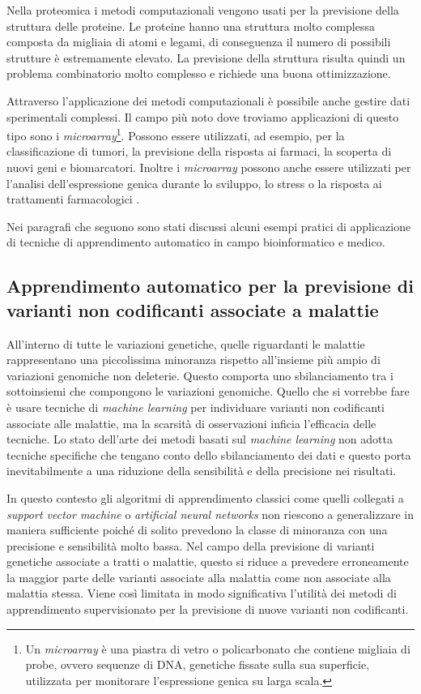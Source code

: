 \documentclass[12pt,italian]{report}
\begin{document}
	Nella proteomica i metodi computazionali vengono usati per la previsione della struttura delle proteine. Le proteine hanno una struttura molto complessa composta da migliaia di atomi e legami, di conseguenza il numero di possibili strutture è estremamente elevato. La previsione della struttura risulta quindi un problema combinatorio molto complesso e richiede una buona ottimizzazione.
	
	Attraverso l'applicazione dei metodi computazionali è possibile anche gestire dati sperimentali complessi. Il campo più noto dove troviamo applicazioni di questo tipo sono i \textit{microarray}\footnote{Un \textit{microarray} è una piastra di vetro o policarbonato che contiene migliaia di probe, ovvero sequenze di DNA, genetiche fissate sulla sua superficie, utilizzata per monitorare l'espressione genica su larga scala.}. Possono essere utilizzati, ad esempio, per la classificazione di tumori, la previsione della risposta ai farmaci, la scoperta di nuovi geni e biomarcatori. Inoltre i \textit{microarray} possono anche essere utilizzati per l'analisi dell'espressione genica durante lo sviluppo, lo stress o la risposta ai trattamenti farmacologici \cite{butte2002use}.
	  
	Nei paragrafi che seguono sono stati discussi alcuni esempi pratici di applicazione di tecniche di apprendimento automatico in campo bioinformatico e medico.
	
	\subsection{Apprendimento automatico per la previsione di varianti non codificanti associate a malattie}
	All'interno di tutte le variazioni genetiche, quelle riguardanti le malattie rappresentano una piccolissima minoranza rispetto all'insieme più ampio di variazioni genomiche non deleterie. Questo comporta uno sbilanciamento tra i sottoinsiemi che compongono le variazioni genomiche. Quello che si vorrebbe fare è usare tecniche di \textit{machine learning} per individuare varianti non codificanti associate alle malattie, ma la scarsità di osservazioni inficia l'efficacia delle tecniche. Lo stato dell'arte dei metodi basati sul \textit{machine learning} non adotta tecniche specifiche che tengano conto dello sbilanciamento dei dati e questo porta inevitabilmente a una riduzione della sensibilità e della precisione nei risultati.
	
	In questo contesto gli algoritmi di apprendimento classici come quelli collegati a \textit{support vector machine} \cite{Cortes1995} o \textit{artificial neural networks} \cite{bishop1995neural} non riescono a generalizzare in maniera sufficiente poiché di solito prevedono la classe di minoranza con una precisione e sensibilità molto bassa.
	Nel campo della previsione di varianti genetiche associate a tratti o malattie, questo si riduce a prevedere erroneamente la maggior parte delle varianti associate alla malattia come non associate alla malattia stessa. Viene così limitata in modo significativa l'utilità dei metodi di apprendimento supervisionato per la previsione di nuove varianti non codificanti.
	
\end{document}
